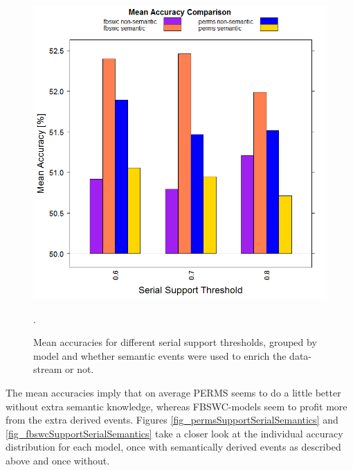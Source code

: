 \begin{figure}
	\centering
  	\includegraphics[width=\textwidth]{semanticVsNonSemanticAccuracy}
	\caption[Accuracy Barchart when Using Semantics]{Mean accuracies for different serial support thresholds, grouped by model and whether semantic events were used to enrich the data-stream or not.}.
	\label{fig_semanticVsNonSemanticAccuracy}
\end{figure}

The mean accuracies imply that on average PERMS seems to do a little better without extra semantic knowledge, whereas FBSWC-models seem to profit more from the extra derived events. Figures \ref{fig_permsSupportSerialSemantics} and \ref{fig_fbswcSupportSerialSemantics} take a closer look at the individual accuracy distribution for each model, once with semantically derived events as described above and once without.

